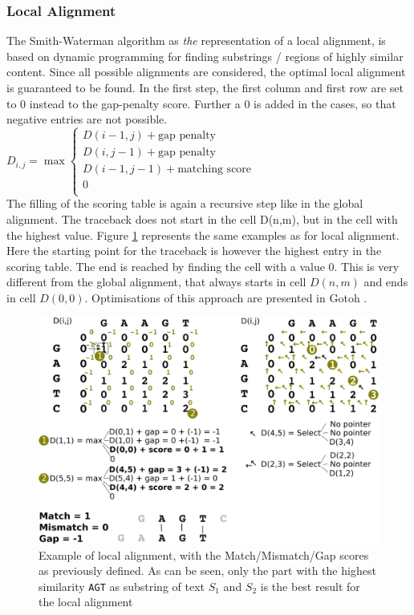 \subsubsection{Local Alignment} \label{localAl}
The Smith-Waterman algorithm \cite{Smith1981} as \textit{the} representation of a local alignment, is based on dynamic programming for finding substrings / regions of highly similar content. Since all possible alignments are considered, the optimal local alignment is guaranteed to be found. In the first step, the first column and first row are set to 0 instead to the gap-penalty score. Further a $0$ is added in the cases, so that negative entries are not possible. 
$ D_{i,j} = \max
  \begin{cases}
    D(i-1,j)+ \text{gap penalty}      \\
    D(i,j-1)+ \text{gap penalty} \\
    D(i-1,j-1)+ \text{matching score} \\
    0 \\
  \end{cases}
$\\
The filling of the scoring table is again a recursive step like in the global alignment. The traceback does not start in the cell D(n,m), but in the cell with the highest value. Figure \ref{fig:local} represents the same examples as for local alignment. Here the starting point for the traceback is however the highest entry in the scoring table. The end is reached by finding the cell with a value 0. This is very different from the global alignment, that always starts in cell $D(n,m)$ and ends in cell $D(0,0)$. Optimisations of this approach are presented in Gotoh \cite{Gotoh1982}.  
\begin{figure}[!ht]
\label{fig:local}
    \centering
    \includegraphics[width=1\textwidth]{images/localAlign.png}
    \caption[Example of local alignment]{Example of local alignment, with the Match/Mismatch/Gap scores as previously defined. As can be seen, only the part with the highest similarity \texttt{AGT} as substring of text $S_1$ and $S_2$ is the best result for the local alignment}
\end{figure}
